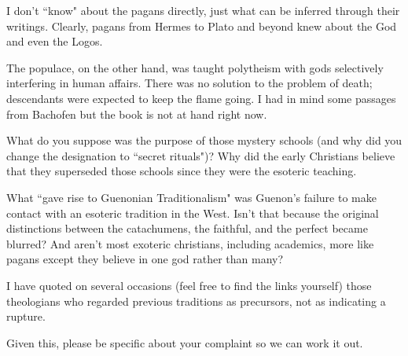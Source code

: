 \begin{footnotesize}
\begin{sffamily}
I don't ``know" about the pagans directly, just what can be inferred through their writings. Clearly, pagans from Hermes to Plato and beyond knew about the God and even the Logos.

The populace, on the other hand, was taught polytheism with gods selectively interfering in human affairs. There was no solution to the problem of death; descendants were expected to keep the flame going. I had in mind some passages from Bachofen but the book is not at hand right now.

What do you suppose was the purpose of those mystery schools (and why did you change the designation to ``secret rituals")? Why did the early Christians believe that they superseded those schools since they were the esoteric teaching.

What ``gave rise to Guenonian Traditionalism" was Guenon's failure to make contact with an esoteric tradition in the West. Isn't that because the original distinctions between the catachumens, the faithful, and the perfect became blurred? And aren't most exoteric christians, including academics, more like pagans except they believe in one god rather than many?

I have quoted on several occasions (feel free to find the links yourself) those theologians who regarded previous traditions as precursors, not as indicating a rupture.

Given this, please be specific about your complaint so we can work it out.


\end{sffamily}\end{footnotesize}
